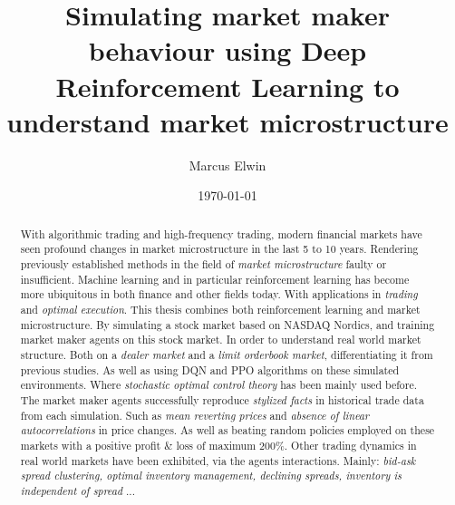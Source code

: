 \documentclass{kththesis}
\title{Simulating market maker behaviour using Deep Reinforcement Learning to understand market microstructure}
\author{Marcus Elwin}
\date{\today}
\theoremstyle{definition}
\begin{document}


%

\frontmatter

\titlepage

\begin{abstract}
With algorithmic trading and high-frequency trading,  modern financial markets have seen profound changes in market microstructure in the last 5 to 10 years. Rendering previously established methods in the field of \textit{market microstructure} faulty or insufficient. Machine learning and in particular reinforcement learning has become more ubiquitous in both finance and other fields today. With applications in \textit{trading} and \textit{optimal execution}. This thesis combines both reinforcement learning and market microstructure. By simulating a stock market based on NASDAQ Nordics, and training market maker agents on this stock market. In order to understand real world market structure. 
\newline
\newline
Both on a \textit{dealer market} and a \textit{limit orderbook market}, differentiating it from previous studies. As well as using DQN and PPO algorithms on these simulated environments. Where \textit{stochastic optimal control theory} has been mainly used before. The market maker agents successfully reproduce \textit{stylized facts} in historical trade data from each simulation. Such as \textit{mean reverting prices} and \textit{absence of linear autocorrelations} in price changes. As well as beating random policies employed on these markets with a positive profit \& loss of maximum $200\%$. Other trading dynamics in real world markets have been exhibited, via the agents interactions. Mainly: \textit{bid-ask spread clustering, optimal inventory management, declining spreads, inventory is independent of spread} ... 

\end{abstract}
\end{document}
